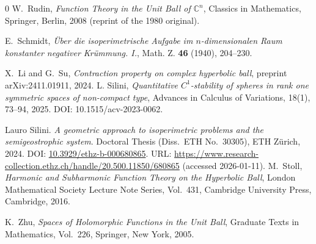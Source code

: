 \documentclass[11pt]{amsart}
\numberwithin{equation}{section}
\begin{document}
\begin{thebibliography}{0}
W.~Rudin,
\emph{Function Theory in the Unit Ball of $\mathbb{C}^n$},
Classics in Mathematics,
Springer, Berlin, 2008 (reprint of the 1980 original).

E.~Schmidt,
\emph{{\"U}ber die isoperimetrische Aufgabe im $n$-dimensionalen Raum konstanter negativer Kr{\"u}mmung. I.},
Math. Z. \textbf{46} (1940), 204--230.

X.~Li and G.~Su,
\emph{Contraction property on complex hyperbolic ball},
preprint arXiv:2411.01911, 2024.
L. Silini, \emph{Quantitative $C^1$-stability of spheres in rank one symmetric spaces of non-compact type}, Advances in Calculus of Variations, 18(1), 73--94, 2025. DOI: 10.1515/acv-2023-0062.

Lauro Silini.
\newblock \emph{A geometric approach to isoperimetric problems and the semigeostrophic system}.
\newblock Doctoral Thesis (Diss.\ ETH No.\ 30305), ETH Z\"urich, 2024.
\newblock DOI: \href{https://doi.org/10.3929/ethz-b-000680865}{10.3929/ethz-b-000680865}.
\newblock URL: \url{https://www.research-collection.ethz.ch/handle/20.500.11850/680865}
(accessed 2026-01-11).
M.~Stoll,
\emph{Harmonic and Subharmonic Function Theory on the Hyperbolic Ball},
London Mathematical Society Lecture Note Series, Vol.~431,
Cambridge University Press, Cambridge, 2016.

K.~Zhu,
\emph{Spaces of Holomorphic Functions in the Unit Ball},
Graduate Texts in Mathematics, Vol.~226,
Springer, New York, 2005.

\end{thebibliography}


\end{document}
